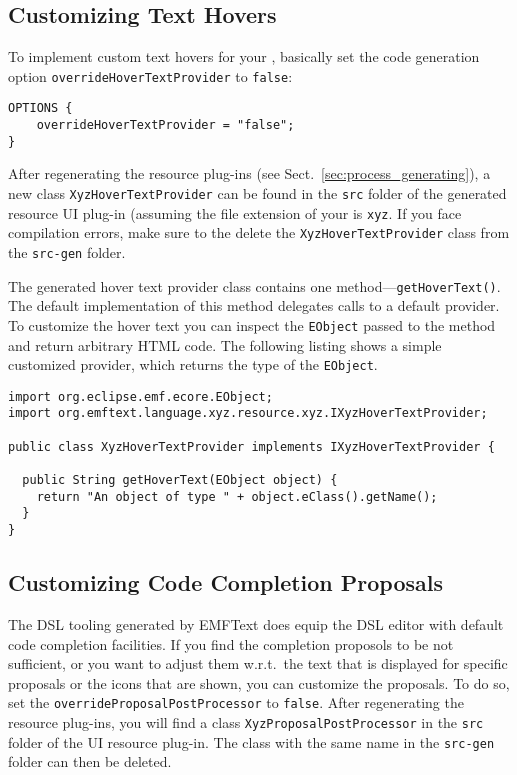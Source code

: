 \subsection{Customizing Text Hovers}

To implement custom text hovers for your \DSL, basically set the code
generation option \texttt{overrideHoverTextProvider} to \texttt{false}:

\begin{lstlisting}
OPTIONS {
    overrideHoverTextProvider = "false";
}
\end{lstlisting}

After regenerating the resource plug-ins (see
Sect.~\ref{sec:process_generating}), a new class
\texttt{XyzHoverTextProvider} can be found in the \texttt{src} folder of the
generated resource UI plug-in (assuming the file extension of your \DSL is \texttt{xyz}.
If you face compilation errors, make sure to the delete the \texttt{XyzHoverTextProvider} 
class from the \texttt{src-gen} folder.

The generated hover text provider class contains one
method---\texttt{getHoverText()}. The default implementation of this
method delegates calls to a default provider. To customize the
hover text you can inspect the \texttt{EObject} passed to the method and return arbitrary HTML code. The
following listing shows a simple customized provider, which returns the type of
the \texttt{EObject}.

\begin{lstlisting}
import org.eclipse.emf.ecore.EObject;
import org.emftext.language.xyz.resource.xyz.IXyzHoverTextProvider;

public class XyzHoverTextProvider implements IXyzHoverTextProvider {
	
  public String getHoverText(EObject object) {
    return "An object of type " + object.eClass().getName();
  }
}
\end{lstlisting}

\subsection{Customizing Code Completion Proposals}
\label{sec:cust_code_completion}

The DSL tooling generated by EMFText does equip the DSL editor with default code
completion facilities. If you find the completion proposols to be not
sufficient, or you want to adjust them w.r.t.~the text that is displayed for
specific proposals or the icons that are shown, you can customize the proposals.
To do so, set the \texttt{overrideProposalPostProcessor} to \texttt{false}. After
regenerating the resource plug-ins, you will find a class
\texttt{XyzProposalPostProcessor} in the \texttt{src} folder of the UI resource
plug-in. The class with the same name in the \texttt{src-gen} folder can then be
deleted.

